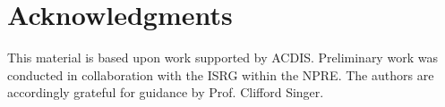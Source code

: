 \section{Acknowledgments}

This material is based upon work supported by \gls{ACDIS}. Preliminary work was 
conducted in collaboration with the \gls{ISRG} within the \gls{NPRE}. The 
authors are accordingly grateful for guidance by Prof. Clifford Singer.


